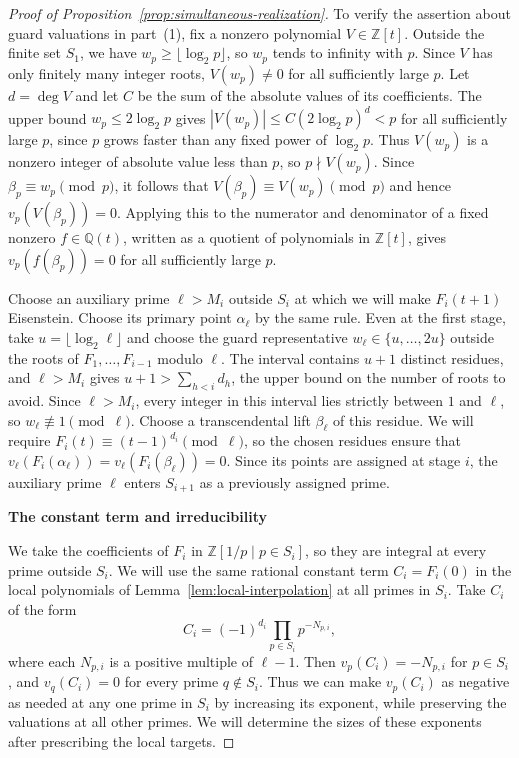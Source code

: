 \documentclass{article}
\newcommand{\proofheading}[1]{%
    \par\addvspace{\smallskipamount}%
    \noindent\textbf{#1}\par\nobreak
}
\theoremstyle{remark}
\begin{document}
\begin{proof}[Proof of Proposition~\ref{prop:simultaneous-realization}]
    To verify the assertion about guard valuations in part~(1), fix a nonzero polynomial $V \in \mathbb{Z}[t]$.
    Outside the finite set $S_1$, we have $w_p \ge \lfloor \log_2 p \rfloor$, so $w_p$ tends to infinity with $p$.
    Since $V$ has only finitely many integer roots, $V(w_p) \ne 0$ for all sufficiently large $p$.
    Let $d = \deg V$ and let $C$ be the sum of the absolute values of its coefficients.
    The upper bound $w_p \le 2 \log_2 p$ gives $|V(w_p)| \le C(2 \log_2 p)^d < p$ for all sufficiently large $p$, since $p$ grows faster than any fixed power of $\log_2 p$.
    Thus $V(w_p)$ is a nonzero integer of absolute value less than $p$, so $p \nmid V(w_p)$.
    Since $\beta_p \equiv w_p \pmod{p}$, it follows that $V(\beta_p) \equiv V(w_p) \pmod{p}$ and hence $v_p(V(\beta_p)) = 0$.
    Applying this to the numerator and denominator of a fixed nonzero $f \in \mathbb{Q}(t)$, written as a quotient of polynomials in $\mathbb{Z}[t]$, gives $v_p(f(\beta_p)) = 0$ for all sufficiently large $p$.

    Choose an auxiliary prime $\ell > M_i$ outside $S_i$ at which we will make $F_i(t + 1)$ Eisenstein.
    Choose its primary point $\alpha_\ell$ by the same rule.
    Even at the first stage, take $u = \lfloor \log_2 \ell \rfloor$ and choose the guard representative $w_\ell \in \{u, \ldots, 2u\}$ outside the roots of $F_1, \ldots, F_{i - 1}$ modulo $\ell$.
    The interval contains $u + 1$ distinct residues, and $\ell > M_i$ gives $u + 1 > \sum_{h < i} d_h$, the upper bound on the number of roots to avoid.
    Since $\ell > M_i$, every integer in this interval lies strictly between $1$ and $\ell$, so $w_\ell \not\equiv 1 \pmod{\ell}$.
    Choose a transcendental lift $\beta_\ell$ of this residue.
    We will require $F_i(t) \equiv (t - 1)^{d_i} \pmod{\ell}$, so the chosen residues ensure that $v_\ell(F_i(\alpha_\ell)) = v_\ell(F_i(\beta_\ell)) = 0$.
    Since its points are assigned at stage $i$, the auxiliary prime $\ell$ enters $S_{i + 1}$ as a previously assigned prime.

    \proofheading{The constant term and irreducibility}
    We take the coefficients of $F_i$ in $\mathbb{Z}[1/p \mid p \in S_i]$, so they are integral at every prime outside $S_i$.
    We will use the same rational constant term $C_i = F_i(0)$ in the local polynomials of Lemma~\ref{lem:local-interpolation} at all primes in $S_i$.
    Take $C_i$ of the form
    \[
        C_i = (-1)^{d_i} \prod_{p \in S_i} p^{-N_{p, i}},
    \]
    where each $N_{p, i}$ is a positive multiple of $\ell - 1$.
    Then $v_p(C_i) = -N_{p, i}$ for $p \in S_i$, and $v_q(C_i) = 0$ for every prime $q \notin S_i$.
    Thus we can make $v_p(C_i)$ as negative as needed at any one prime in $S_i$ by increasing its exponent, while preserving the valuations at all other primes.
    We will determine the sizes of these exponents after prescribing the local targets.


\end{proof}
\end{document}

